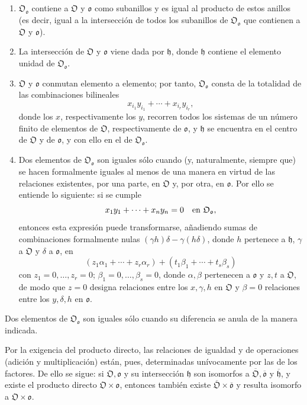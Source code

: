 \begin{enumerate}
\item[(1)] $\mathfrak O_{\mathfrak o}$ contiene a $\mathfrak O$ y $\mathfrak o$ como subanillos y es igual al producto de estos anillos (es decir, igual a la intersección de todos los subanillos de $\mathfrak O_{\mathfrak o}$ que contienen a $\mathfrak O$ y $\mathfrak o$).

\item[(2)] La intersección de $\mathfrak O$ y $\mathfrak o$ viene dada por $\mathfrak h$, donde $\mathfrak h$ contiene el elemento unidad de $\mathfrak O_{\mathfrak o}$.

\item[(3)] $\mathfrak O$ y $\mathfrak o$ conmutan elemento a elemento; por tanto, $\mathfrak O_{\mathfrak o}$ consta de la totalidad de las combinaciones bilineales
\[
x_{i_1}y_{i_1}+\cdots+x_{i_r}y_{i_r},
\]
donde los $x$, respectivamente los $y$, recorren todos los sistemas de un número finito de elementos de $\mathfrak O$, respectivamente de $\mathfrak o$, y $\mathfrak h$ se encuentra en el centro de $\mathfrak O$ y de $\mathfrak o$, y con ello en el de $\mathfrak O_{\mathfrak o}$.

\item[(4)] Dos elementos de $\mathfrak O_{\mathfrak o}$ son iguales sólo cuando (y, naturalmente, siempre que) se hacen formalmente iguales al menos de una manera en virtud de las relaciones existentes, por una parte, en $\mathfrak O$ y, por otra, en $\mathfrak o$. Por ello se entiende lo siguiente: si se cumple
\[
x_1y_1+\cdots+x_ny_n=0
\quad\hbox{en }\mathfrak O_{\mathfrak o},
\]
entonces esta expresión puede transformarse, añadiendo sumas de combinaciones formalmente nulas $(\gamma h)\delta-\gamma(h\delta)$, donde $h$ pertenece a $\mathfrak h$, $\gamma$ a $\mathfrak O$ y $\delta$ a $\mathfrak o$, en
\[
(z_1\alpha_1+\cdots+z_r\alpha_r)+(t_1\beta_1+\cdots+t_s\beta_s)
\]
con $z_1=0,\ldots,z_r=0$; $\beta_1=0,\ldots,\beta_s=0$, donde $\alpha,\beta$ pertenecen a $\mathfrak o$ y $z,t$ a $\mathfrak O$, de modo que $z=0$ designa relaciones entre los $x,\gamma,h$ en $\mathfrak O$ y $\beta=0$ relaciones entre los $y,\delta,h$ en $\mathfrak o$.
\end{enumerate}

Dos elementos de $\mathfrak O_{\mathfrak o}$ son iguales sólo cuando su diferencia se anula de la manera indicada.

Por la exigencia del producto directo, las relaciones de igualdad y de operaciones (adición y multiplicación) están, pues, determinadas unívocamente por las de los factores. De ello se sigue: si $\mathfrak O,\mathfrak o$ y su intersección $\mathfrak h$ son isomorfos a $\overline{\mathfrak O},\overline{\mathfrak o}$ y $\overline{\mathfrak h}$, y existe el producto directo $\mathfrak O\times\mathfrak o$, entonces también existe $\overline{\mathfrak O}\times\overline{\mathfrak o}$ y resulta isomorfo a $\mathfrak O\times\mathfrak o$.


